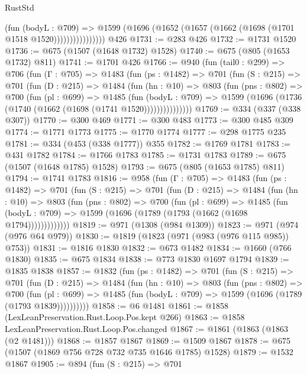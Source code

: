 \begin{lexlean}{RustStd}
\begin{coremodule}
                      (fun (bodyL : @709) =>
                      @1599 (@1696 (@1652 (@1657 (@1662 (@1698 (@1701 @1518 @1520))))))))))))))))
    @426
@1731 := @283 @426
@1732 := @1731 @1520
@1736 := @675 (@1507 (@1648 @1732) @1528)
@1740 := @675 (@805 (@1653 @1732) @811)
@1741 := @1701 @426
@1766 := @940
    (fun (tail0 : @299) =>
    @706
      (fun (Γ : @705) =>
      @1483
        (fun (ps : @1482) =>
        @701
          (fun (S : @215) =>
          @701
            (fun (D : @215) =>
            @1484
              (fun (hn : @10) =>
              @803
                (fun (pns : @802) =>
                @700
                  (fun (pl : @699) =>
                  @1485
                    (fun (bodyL : @709) =>
                    @1599 (@1696 (@1736 (@1740 (@1662 (@1698 (@1741 @1520)))))))))))))))
@1769 := @334 (@337 (@338 @307))
@1770 := @300 @469
@1771 := @300 @483
@1773 := @300 @485 @309
@1774 := @1771 @1773
@1775 := @1770 @1774
@1777 := @298 @1775 @235
@1781 := @334 (@453 (@338 @1777)) @355
@1782 := @1769 @1781
@1783 := @431 @1782
@1784 := @1766 @1783
@1785 := @1731 @1783
@1789 := @675 (@1507 (@1648 @1785) @1528)
@1793 := @675 (@805 (@1653 @1785) @811)
@1794 := @1741 @1783
@1816 := @958
    (fun (Γ : @705) =>
    @1483
      (fun (ps : @1482) =>
      @701
        (fun (S : @215) =>
        @701
          (fun (D : @215) =>
          @1484
            (fun (hn : @10) =>
            @803
              (fun (pns : @802) =>
              @700
                (fun (pl : @699) =>
                @1485
                  (fun (bodyL : @709) => @1599 (@1696 (@1789 (@1793 (@1662 (@1698 @1794)))))))))))))
@1819 := @971 (@1308 (@984 @1309))
@1823 := @971 (@974 (@976 @64 @979))
@1830 := @1819 (@1823 (@971 (@983 (@976 @115 @985)) @753))
@1831 := @1816 @1830
@1832 := @673 @1482
@1834 := @1660 (@766 @1830)
@1835 := @675 @1834
@1838 := @773 @1830 @1697 @1794
@1839 := @1835 @1838
@1857 := @1832
    (fun (ps : @1482) =>
    @701
      (fun (S : @215) =>
      @701
        (fun (D : @215) =>
        @1484
          (fun (hn : @10) =>
          @803
            (fun (pns : @802) =>
            @700
              (fun (pl : @699) =>
              @1485 (fun (bodyL : @709) => @1599 (@1696 (@1789 (@1793 @1839))))))))))
@1858 := @6 @1481
@1861 := @1858 (LexLeanPreservation.Rust.Loop.Pos.kept @266)
@1863 := @1858 LexLeanPreservation.Rust.Loop.Pos.changed
@1867 := @1861 (@1863 (@1863 (@2 @1481)))
@1868 := @1857 @1867
@1869 := @1509 @1867
@1878 := @675 (@1507 (@1869 @756 @728 @732 @735 @1646 @1785) @1528)
@1879 := @1532 @1867
@1905 := @894
    (fun (S : @215) =>
    @701

\end{coremodule}
\end{lexlean}
